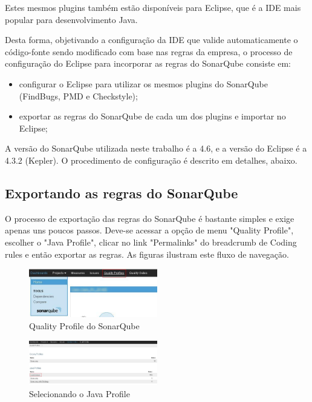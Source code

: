 \documentclass[12pt,journal,compsoc]{IEEEtran}
\begin{document}
Estes mesmos plugins também estão disponíveis para Eclipse, que é a IDE mais popular para desenvolvimento Java. 

Desta forma, objetivando a configuração da IDE que valide automaticamente o código-fonte sendo modificado com base nas regras da empresa, o processo de configuração do Eclipse para incorporar as regras do SonarQube consiste em:

\begin{itemize}
\item configurar o Eclipse para utilizar os mesmos plugins do SonarQube (FindBugs, PMD e Checkstyle); 
\item exportar as regras do SonarQube de cada um dos plugins e importar no Eclipse;
\end{itemize}

A versão do SonarQube utilizada neste trabalho é a 4.6, e a versão do Eclipse é a 4.3.2 (Kepler).
O procedimento de configuração é descrito em detalhes, abaixo.

\subsection{Exportando as regras do SonarQube}

O processo de exportação das regras do SonarQube é bastante simples e exige apenas uns poucos passos. Deve-se acessar a opção de menu "Quality Profile", escolher o "Java Profile", clicar no link "Permalinks" do breadcrumb de Coding rules e então exportar as regras. As figuras ilustram este fluxo de navegação.

\begin{figure}[ht!]
\centering
\includegraphics[width=0.5\textwidth]{img/sonar-step-01}
\caption{Quality Profile do SonarQube}
\label{sonar-step-01}
\end{figure} 

\begin{figure}[ht!]
\centering
\includegraphics[width=0.5\textwidth]{img/sonar-step-02}
\caption{Selecionando o Java Profile}
\label{sonar-step-02}
\end{figure} 
\end{document}
